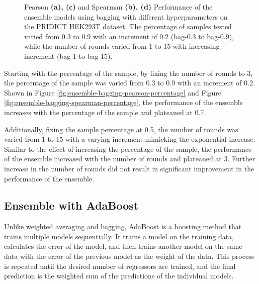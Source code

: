 \begin{figure}
    \centering
    \caption[Ensemble Model Performance]{Pearson \textbf{(a), (c)} and Spearman \textbf{(b), (d)} Performance of the ensemble models using bagging with different hyperparameters on the PRIDICT HEK293T dataset. The percentage of samples tested varied from 0.3 to 0.9 with an increment of 0.2 (bag-0.3 to bag-0.9), while the number of rounds varied from 1 to 15 with increasing increment (bag-1 to bag-15). }
    \label{fig:ensemble-bagging-tuning}
\end{figure}

Starting with the percentage of the sample, by fixing the number of rounds to 3, the percentage of the sample was varied from 0.3 to 0.9 with an increment of 0.2. Shown in Figure \ref{fig:ensemble-bagging-pearson-percentage} and Figure \ref{fig:ensemble-bagging-spearman-percentage}, the performance of the ensemble increases with the percentage of the sample and plateaued at 0.7. 

Additionally, fixing the sample percentage at 0.5, the number of rounds was varied from 1 to 15 with a varying increment mimicking the exponential increase. Similar to the effect of increasing the percentage of the sample, the performance of the ensemble increased with the number of rounds and plateaued at 3. Further increase in the number of rounds did not result in significant improvement in the performance of the ensemble.

\subsection{Ensemble with AdaBoost}

Unlike weighted averaging and bagging, AdaBoost is a boosting method that trains multiple models sequentially. It trains a model on the training data, calculates the error of the model, and then trains another model on the same data with the error of the previous model as the weight of the data. This process is repeated until the desired number of regressors are trained, and the final prediction is the weighted sum of the predictions of the individual models. 


